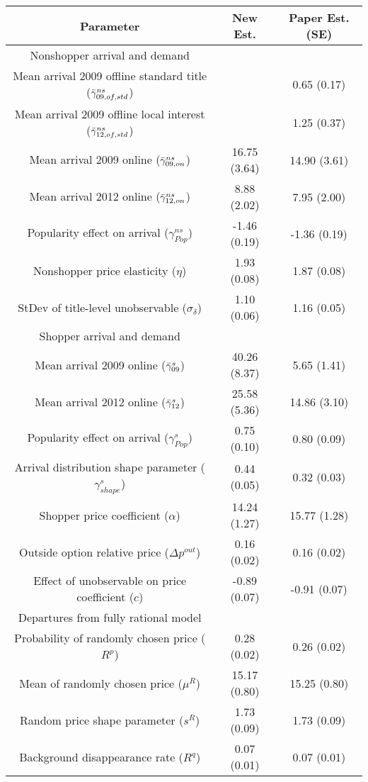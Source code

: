 \begin{table}[h]
\centering
\begin{tabular}{c|c|c}\toprule Parameter & New Est. & Paper Est. (SE)\\[2mm]\hline 
 Nonshopper arrival and demand  \\ 
 \hline
Mean arrival 2009 offline standard title ($\Bar{\gamma}^{ns}_{09,of,std}$) &  & 0.65 (0.17)\\ 
 Mean arrival 2009 offline local interest ($\Bar{\gamma}^{ns}_{12,of,std}$) &  & 1.25 (0.37)\\ 
 Mean arrival 2009 online ($\Bar{\gamma}^{ns}_{09,on}$) &  16.75 (3.64) & 14.90 (3.61)\\ 
 Mean arrival 2012 online ($\Bar{\gamma}^{ns}_{12,on}$) &  8.88 (2.02) & 7.95 (2.00)\\ 
 Popularity effect on arrival ($\gamma^{ns}_{Pop}$) &  -1.46 (0.19) & -1.36 (0.19)\\ 
 Nonshopper price elasticity ($\eta$) &  1.93 (0.08) & 1.87 (0.08)\\ 
 StDev of title-level unobservable ($\sigma_{\delta}$) &  1.10 (0.06) & 1.16 (0.05)\\ 
 \hline 
 Shopper arrival and demand  \\ 
 \hline
Mean arrival 2009 online ($\Bar{\gamma}^s_{09}$) &  40.26 (8.37) & 5.65 (1.41)\\ 
 Mean arrival 2012 online ($\Bar{\gamma}^s_{12}$) &  25.58 (5.36) & 14.86 (3.10)\\ 
 Popularity effect on arrival ($\gamma^{s}_{Pop}$) &  0.75 (0.10) & 0.80 (0.09)\\ 
 Arrival distribution shape parameter ($\gamma^s_{shape}$) &  0.44 (0.05) & 0.32 (0.03)\\ 
 Shopper price coefficient ($\alpha$) &  14.24 (1.27) & 15.77 (1.28)\\ 
 Outside option relative price ($\Delta p^{out}$) &  0.16 (0.02) & 0.16 (0.02)\\ 
 Effect of unobservable on price coefficient ($c$) &  -0.89 (0.07) & -0.91 (0.07)\\ 
 \hline 
 Departures from fully rational model  \\ 
 \hline
Probability of randomly chosen price ($R^p$) &  0.28 (0.02) & 0.26 (0.02)\\ 
 Mean of randomly chosen price ($\mu^R$) &  15.17 (0.80) & 15.25 (0.80)\\ 
 Random price shape parameter ($s^R$) &  1.73 (0.09) & 1.73 (0.09)\\ 
 Background disappearance rate ($R^q$) &  0.07 (0.01) & 0.07 (0.01)\\ 
 \end{tabular}\label{tab:my_label}\end{table}